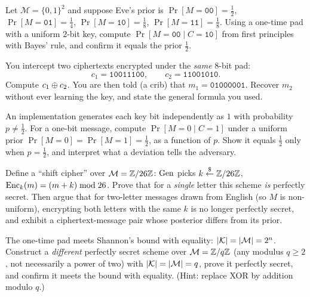 \begin{exercise}
\label{ch09:ex-bayes}
Let $\mathcal{M} = \{0,1\}^2$ and suppose Eve's prior is $\Pr[M=\texttt{00}]=\tfrac12$, $\Pr[M=\texttt{01}]=\tfrac14$, $\Pr[M=\texttt{10}]=\tfrac18$, $\Pr[M=\texttt{11}]=\tfrac18$. Using a one-time pad with a uniform $2$-bit key, compute $\Pr[M=\texttt{00}\mid C=\texttt{10}]$ from first principles with Bayes' rule, and confirm it equals the prior $\tfrac12$.
\end{exercise}

\begin{exercise}
\label{ch09:ex-twotime}
You intercept two ciphertexts encrypted under the \emph{same} 8-bit pad:
\[
  c_1 = \texttt{10011100}, \qquad c_2 = \texttt{11001010}.
\]
Compute $c_1 \oplus c_2$. You are then told (a crib) that $m_1 = \texttt{01000001}$. Recover $m_2$ without ever learning the key, and state the general formula you used.
\end{exercise}

\begin{exercise}
\label{ch09:ex-bias}
An implementation generates each key bit independently as $1$ with probability $p \ne \tfrac12$. For a one-bit message, compute $\Pr[M=0 \mid C=1]$ under a uniform prior $\Pr[M=0]=\Pr[M=1]=\tfrac12$, as a function of $p$. Show it equals $\tfrac12$ only when $p=\tfrac12$, and interpret what a deviation tells the adversary.
\end{exercise}

\begin{exercise}
\label{ch09:ex-notperfect}
Define a ``shift cipher'' over $\mathcal{M}=\mathbb{Z}/26\mathbb{Z}$: $\operatorname{Gen}$ picks $k \stackrel{\$}{\gets} \mathbb{Z}/26\mathbb{Z}$, $\operatorname{Enc}_k(m) = (m+k) \bmod 26$. Prove that for a \emph{single} letter this scheme \emph{is} perfectly secret. Then argue that for two-letter messages drawn from English (so $M$ is non-uniform), encrypting both letters with the same $k$ is no longer perfectly secret, and exhibit a ciphertext-message pair whose posterior differs from its prior.
\end{exercise}

\begin{exercise}
\label{ch09:ex-tight}
The one-time pad meets Shannon's bound with equality: $\lvert\mathcal{K}\rvert = \lvert\mathcal{M}\rvert = 2^n$. Construct a \emph{different} perfectly secret scheme over $\mathcal{M} = \mathbb{Z}/q\mathbb{Z}$ (any modulus $q \ge 2$, not necessarily a power of two) with $\lvert\mathcal{K}\rvert = \lvert\mathcal{M}\rvert = q$, prove it perfectly secret, and confirm it meets the bound with equality. (Hint: replace XOR by addition modulo $q$.)
\end{exercise}

